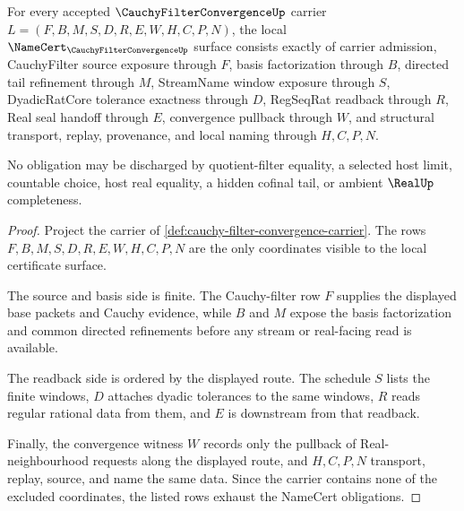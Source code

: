 \begin{theorem}
\label{thm:cauchy-filter-convergence-namecert-obligations}
For every accepted $\CauchyFilterConvergenceUp$ carrier $L=(F,B,M,S,D,R,E,W,H,C,P,N)$, the local $\NameCert_{\CauchyFilterConvergenceUp}$ surface consists exactly of carrier admission, CauchyFilter source exposure through $F$, basis factorization through $B$, directed tail refinement through $M$, StreamName window exposure through $S$, DyadicRatCore tolerance exactness through $D$, RegSeqRat readback through $R$, Real seal handoff through $E$, convergence pullback through $W$, and structural transport, replay, provenance, and local naming through $H,C,P,N$.

No obligation may be discharged by quotient-filter equality, a selected host limit, countable choice, host real equality, a hidden cofinal tail, or ambient $\RealUp$ completeness.
\end{theorem}
\begin{proof}
Project the carrier of \autoref{def:cauchy-filter-convergence-carrier}. The rows $F,B,M,S,D,R,E,W,H,C,P,N$ are the only coordinates visible to the local certificate surface.

The source and basis side is finite. The Cauchy-filter row $F$ supplies the displayed base packets and Cauchy evidence, while $B$ and $M$ expose the basis factorization and common directed refinements before any stream or real-facing read is available.

The readback side is ordered by the displayed route. The schedule $S$ lists the finite windows, $D$ attaches dyadic tolerances to the same windows, $R$ reads regular rational data from them, and $E$ is downstream from that readback.

Finally, the convergence witness $W$ records only the pullback of Real-neighbourhood requests along the displayed route, and $H,C,P,N$ transport, replay, source, and name the same data. Since the carrier contains none of the excluded coordinates, the listed rows exhaust the NameCert obligations.
\end{proof}

